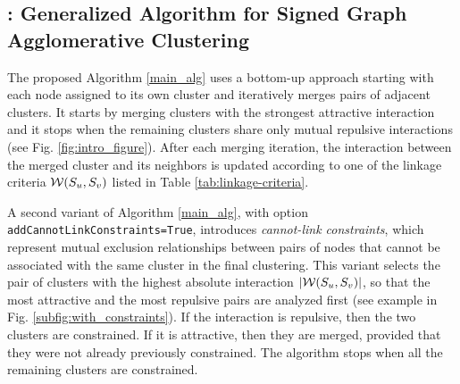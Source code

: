 \subsection{\algname{}: Generalized Algorithm for Signed Graph Agglomerative Clustering} \label{sec:algorithm} 

The proposed \algname{} Algorithm \ref{main_alg} uses a bottom-up approach starting with each node assigned to its own cluster and iteratively merges pairs of adjacent clusters. It starts by merging clusters with the strongest attractive interaction and it stops when the remaining clusters share only mutual repulsive interactions (see Fig. \hyperref[fig:intro_figure]{\ref*{fig:intro_figure}}). After each merging iteration, the interaction between the merged cluster and its neighbors is updated according to one of the linkage criteria $\mathcal{W}(S_u, S_v)$ listed in Table \ref{tab:linkage-criteria}.

A second variant of Algorithm \ref{main_alg}, with option \texttt{addCannotLinkConstraints=True}, introduces \emph{cannot-link constraints}, which represent mutual exclusion relationships between pairs of nodes that cannot be associated with the same cluster in the final clustering. This variant 
selects the pair of clusters with the highest absolute interaction $|\mathcal{W}(S_u, S_v)|$, so that the most attractive and the most repulsive pairs are analyzed first (see example in Fig. \ref{subfig:with_constraints}). If the interaction is repulsive, then the two clusters are constrained. If it is attractive, then they are merged, provided that they were not already previously constrained. 
The algorithm stops when all the remaining clusters are constrained.

